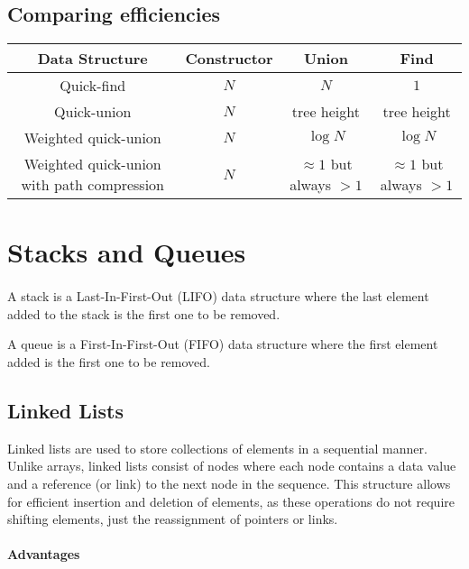 \documentclass{article}
\begin{document}
\subsection{Comparing efficiencies}
\begin{center}
\begin{tabular}{||c c c c||} 
 \hline
 Data Structure & Constructor & Union & Find \\ [0.5ex] 
 \hline\hline
 Quick-find & $N$ & $N$ & $1$ \\ 
 \hline
 Quick-union & $N$ & tree height & tree height \\
 \hline
 Weighted quick-union & $N$ & $\log{N}$ & $\log{N}$ \\
 \hline
 Weighted quick-union with path compression & $N$ & $\approx{1}$ but always $>1$ & $\approx{1}$ but always $>1$  \\
 \hline
\end{tabular}
\end{center}

\section{Stacks and Queues}
\paragraph{}
A stack is a Last-In-First-Out (LIFO) data structure where the last element added to the stack is the first one to be removed.

A queue is a First-In-First-Out (FIFO) data structure where the first element added is the first one to be removed.

\subsection{Linked Lists}

Linked lists are used to store collections of elements in a sequential manner. Unlike arrays, linked lists consist of nodes where each node contains a data value and a reference (or link) to the next node in the sequence. This structure allows for efficient insertion and deletion of elements, as these operations do not require shifting elements, just the reassignment of pointers or links.

\paragraph{Advantages}
\end{document}
